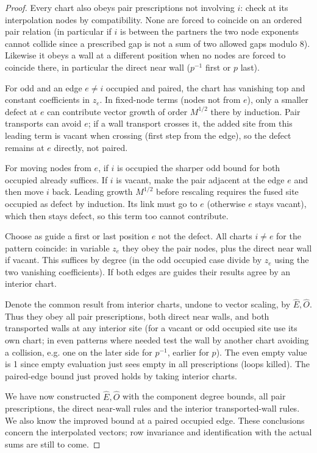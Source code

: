 \documentclass[11pt]{article}
\numberwithin{equation}{section}
\theoremstyle{definition}\newtheorem{definition}[theorem]{Definition}
\theoremstyle{remark}\newtheorem{remark}[theorem]{Remark}
\begin{document}
\begin{proof}
Every chart also obeys pair prescriptions not involving \(i\): check at its interpolation nodes by compatibility. None are forced to coincide on an ordered pair relation (in particular if \(i\) is between the partners the two node exponents cannot collide since a prescribed gap is not a sum of two allowed gaps modulo 8). Likewise it obeys a wall at a different position when no nodes are forced to coincide there, in particular the direct near wall (\(p^{-1}\) first or \(p\) last).

For odd and an edge \(e\ne i\) occupied and paired, the chart has vanishing top and constant coefficients in \(z_e\). In fixed-node terms (nodes not from \(e\)), only a smaller defect at \(e\) can contribute vector growth of order \(M^{1/2}\) there by induction. Pair transports can avoid \(e\); if a wall transport crosses it, the added site from this leading term is vacant when crossing (first step from the edge), so the defect remains at \(e\) directly, not paired. 

For moving nodes from \(e\), if \(i\) is occupied the sharper odd bound for both occupied already suffices. If \(i\) is vacant, make the pair adjacent at the edge \(e\) and then move \(i\) back. Leading growth \(M^{1/2}\) before rescaling requires the fused site occupied as defect by induction. Its link must go to \(e\) (otherwise \(e\) stays vacant), which then stays defect, so this term too cannot contribute.

Choose as guide a first or last position \(e\) not the defect. All charts \(i\ne e\) for the pattern coincide: in variable \(z_e\) they obey the pair nodes, plus the direct near wall if vacant. This suffices by degree (in the odd occupied case divide by \(z_e\) using the two vanishing coefficients). If both edges are guides their results agree by an interior chart. 

Denote the common result from interior charts, undone to vector scaling, by \(\widehat E,\widehat O\). Thus they obey all pair prescriptions, both direct near walls, and both transported walls at any interior site (for a vacant or odd occupied site use its own chart; in even patterns where needed test the wall by another chart avoiding a collision, e.g. one on the later side for \(p^{-1}\), earlier for \(p\)). The even empty value is 1 since empty evaluation just sees empty in all prescriptions (loops killed). The paired-edge bound just proved holds by taking interior charts.

We have now constructed $\widehat E,\widehat O$ with the component degree
bounds, all pair prescriptions, the direct near-wall rules and the
interior transported-wall rules. We also know the improved bound at a
paired occupied edge. These conclusions concern the interpolated vectors;
row invariance and identification with the actual sums are still to come.


\end{proof}
\end{document}
